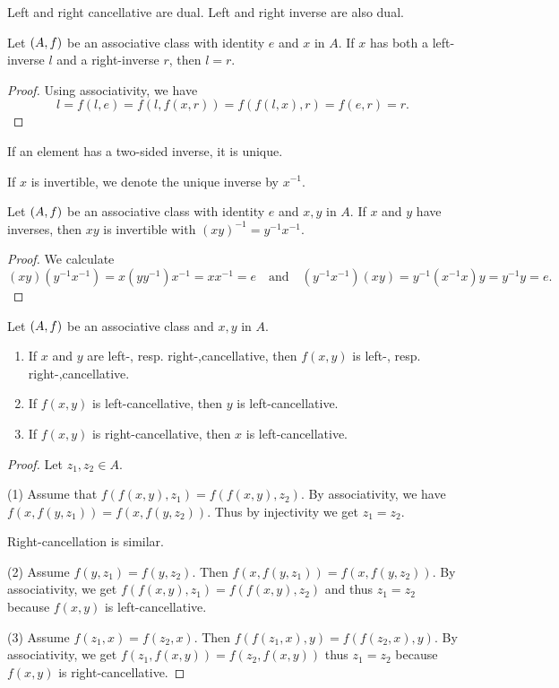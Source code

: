 Left and right cancellative are dual. Left and right inverse are also dual.

\begin{proposition} \label{leftRightInverse}
Let $\left( A, f \right)$ be an associative class with identity $e$ and $x$ in $A$. If $x$ has both a left-inverse $l$ and a right-inverse $r$, then $l = r$.
\end{proposition}
\begin{proof}
Using associativity, we have
\[ l = f(l,e) = f(l, f(x,r)) = f(f(l,x), r) = f(e, r) = r. \]
\end{proof}
\begin{corollary}
If an element has a two-sided inverse, it is unique.
\end{corollary}
If $x$ is invertible, we denote the unique inverse by $x^{-1}$.

\begin{proposition}
Let $\left( A, f \right)$ be an associative class with identity $e$ and $x,y$ in $A$. If $x$ and $y$ have inverses, then $xy$ is invertible with $(xy)^{-1} = y^{-1}x^{-1}$.
\end{proposition}
\begin{proof}
We calculate
\[ (xy)(y^{-1}x^{-1}) = x(yy^{-1})x^{-1} = xx^{-1} = e \quad\text{and}\quad (y^{-1}x^{-1})(xy) = y^{-1}(x^{-1}x)y = y^{-1}y = e. \]
\end{proof}

\begin{lemma}
Let $\left( A, f \right)$ be an associative class and $x,y$ in $A$.
\begin{enumerate}
\item If $x$ and $y$ are left-, resp. right-,cancellative, then $f(x,y)$ is left-, resp. right-,cancellative.
\item If $f(x,y)$ is left-cancellative, then $y$ is left-cancellative.
\item If $f(x,y)$ is right-cancellative, then $x$ is left-cancellative.
\end{enumerate}
\end{lemma}
\begin{proof}
Let $z_1, z_2\in A$.

(1) Assume that $f(f(x,y), z_1) = f(f(x,y), z_2)$. By associativity, we have $f(x,f(y, z_1)) = f(x,f(y, z_2))$. Thus by injectivity we get $z_1 = z_2$.

Right-cancellation is similar.

(2) Assume $f(y,z_1) = f(y,z_2)$. Then $f(x, f(y,z_1)) = f(x, f(y,z_2))$. By associativity, we get $f(f(x,y), z_1) = f(f(x,y), z_2)$ and thus $z_1 = z_2$ because $f(x,y)$ is left-cancellative.

(3) Assume $f(z_1, x) = f(z_2, x)$. Then $f(f(z_1, x), y) = f(f(z_2, x), y)$. By associativity, we get $f(z_1, f(x,y)) = f(z_2, f(x,y))$ thus $z_1 = z_2$ because $f(x,y)$ is right-cancellative.
\end{proof}

